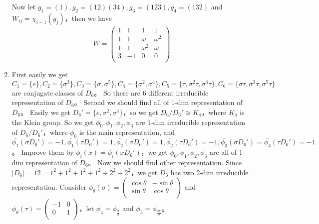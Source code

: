 \documentclass{ctexart}
\begin{document}
\begin{solution}
\begin{enumerate}
      Now let \(g_1 = ( 1),g_2 = ( 12)( 34),g_3 = ( 123),g_4=( 132) \) and \(W_{ij}=\chi_{i-1}( g_j)\)\nolinebreak[4]，then we have
      \[
        W=
        \begin{pmatrix}
          1 & 1  & 1        & 1        \\
          1 & 1  & \omega   & \omega^2 \\
          1 & 1  & \omega^2 & \omega   \\
          3 & -1 & 0        & 0        \\
        \end{pmatrix}
      \]
    \item
      First easily we get \(C_1=\{ e\},C_2=\{ \sigma^3\},C_3=\{ \sigma,\sigma^5\},C_4=\{ \sigma^2,\sigma^4\},C_5=\{ \tau,\sigma^2 \tau,\sigma^4 \tau\},C_6=\{ \sigma \tau,\sigma^3 \tau,\sigma^5 \tau\}\) are conjugate classes of \(D_6\)\nolinebreak[4]。
      So there are \(6\) different irreducible representation of \(D_6\)\nolinebreak[4]。
      Second we should find all of \(1\)-dim representation of \(D_6\)\nolinebreak[4]。
      Easily we get \(D_6' = \{e,\sigma^2,\sigma^4 \}\)\nolinebreak[4]，so we get \(D_6 / D_6' \cong K_4\)\nolinebreak[4]，where \(K_4\) is the Klein group.
      So we get \(\overline{\phi_0},\overline{\phi_1},\overline{\phi_2},\overline{\phi_3}\) are \(1\)-dim irreducible representation of \(D_6 / D_6'\)\nolinebreak[4]，where
      \(\overline{\phi_0}\) is the main representation, and \(\overline{\phi_1}( \sigma D_6')=-1,\overline{\phi_1}( \tau D_6')=1,\overline{\phi_2}( \sigma D_6')=1,\overline{\phi_2}( \tau D_6')=-1,\overline{\phi_3}( \sigma D_6')=\overline{\phi_3}( \tau D_6')=-1\)\nolinebreak[4]。
      Improve them by \(\phi_i( x)=\overline{\phi_i}( x D_6')\)\nolinebreak[4]，we get \(\phi_0,\phi_1,\phi_2,\phi_3\) are all of \(1\)-dim representation of \(D_6\)\nolinebreak[4]。
      Now we should find other representation. Since \(| D_6|=12=1^2+1^2+1^2+1^2+2^2+2^2\)\nolinebreak[4]，we get \(D_6\) has two \(2\)-dim irreducible representation.
      Consider \(\phi_\theta( \sigma)=
        \begin{pmatrix}
          \cos \theta & -\sin \theta \\
          \sin \theta & \cos \theta  \\
      \end{pmatrix}\) and \(\phi_\theta( \tau)=
        \begin{pmatrix}
          -1 & 0 \\
          0  & 1 \\
      \end{pmatrix}\)\nolinebreak[4]，let \(\phi_4=\phi_{\frac{\pi}{3}}\) and \(\phi_5=\phi_{\frac{2\pi}{3}}\)\nolinebreak[4]。

\end{enumerate}
\end{solution}
\end{document}
